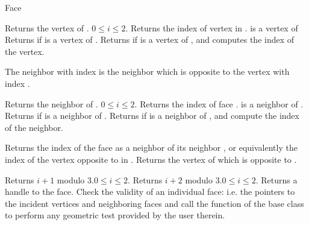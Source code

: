 \begin{ccClass} {Face}

{Returns  the vertex  of \ccVar.
\ccPrecond $0\leq i \leq 2$.}
\ccGlue
{}
{Returns the index of vertex  in \ccVar. \ccPrecond {} is
a vertex of \ccVar}
\ccGlue
{}
{Returns  if   is a vertex of \ccVar.}
\ccGlue
{}
{Returns  if   is a vertex of \ccVar, and
 computes the index  of the vertex.}




The neighbor with index  is the neighbor which is opposite
to the vertex with index .


{Returns  the neighbor  of \ccVar.
\ccPrecond $0\leq i \leq 2$.
}
\ccGlue
{}
{Returns the index of face .
\ccPrecond {} is a neighbor of \ccVar.}
\ccGlue
{}
{Returns  if  is a neighbor of \ccVar.}
\ccGlue
{}
{Returns  if  is a neighbor of \ccVar,  and
compute the index  of the neighbor.}

{Returns the index of the face  as a neighbor
of its neighbor , or equivalently the index
of the vertex opposite to  in .}
\ccGlue
{}
{Returns the vertex of 
which is opposite to .}



 
{Returns $i+1$ modulo 3.\ccPrecond $0\leq i \leq 2$.}
\ccGlue
{}
{Returns $i+2$ modulo 3.\ccPrecond $0\leq i \leq 2$.}
\ccGlue
{}
{Returns a handle to the face.}
\ccGlue
{} 
{Check the validity of an individual face:
i.e. the pointers to the incident vertices
and neighboring faces
 and call the 
function of the base class to perform any geometric test provided by the user
therein.}

\end{ccClass}


